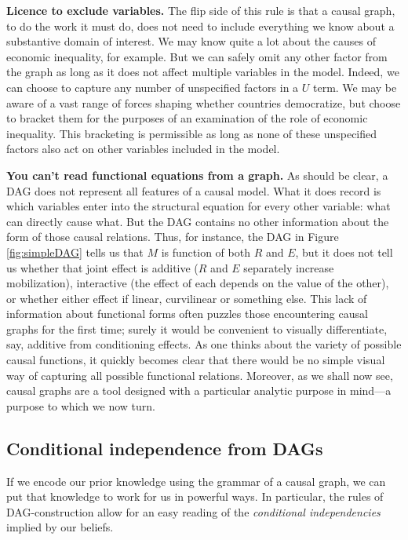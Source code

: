 \documentclass[
  12pt,
]{book}
\begin{document}
\textbf{Licence to exclude variables.} The flip side of this rule is that a causal graph, to do the work it must do, does not need to include everything we know about a substantive domain of interest. We may know quite a lot about the causes of economic inequality, for example. But we can safely omit any other factor from the graph as long as it does not affect multiple variables in the model. Indeed, we can choose to capture any number of unspecified factors in a \(U\) term. We may be aware of a vast range of forces shaping whether countries democratize, but choose to bracket them for the purposes of an examination of the role of economic inequality. This bracketing is permissible as long as none of these unspecified factors also act on other variables included in the model.

\textbf{You can't read functional equations from a graph.} As should be clear, a DAG does not represent all features of a causal model. What it does record is which variables enter into the structural equation for every other variable: what can directly cause what. But the DAG contains no other information about the form of those causal relations. Thus, for instance, the DAG in Figure \ref{fig:simpleDAG} tells us that \(M\) is function of both \(R\) and \(E\), but it does not tell us whether that joint effect is additive (\(R\) and \(E\) separately increase mobilization), interactive (the effect of each depends on the value of the other), or whether either effect if linear, curvilinear or something else. This lack of information about functional forms often puzzles those encountering causal graphs for the first time; surely it would be convenient to visually differentiate, say, additive from conditioning effects. As one thinks about the variety of possible causal functions, it quickly becomes clear that there would be no simple visual way of capturing all possible functional relations. Moreover, as we shall now see, causal graphs are a tool designed with a particular analytic purpose in mind---a purpose to which we now turn.

\hypertarget{conditional-independence-from-dags}{%
\subsection{Conditional independence from DAGs}\label{conditional-independence-from-dags}}

If we encode our prior knowledge using the grammar of a causal graph, we can put that knowledge to work for us in powerful ways. In particular, the rules of DAG-construction allow for an easy reading of the \emph{conditional independencies} implied by our beliefs.
\end{document}
